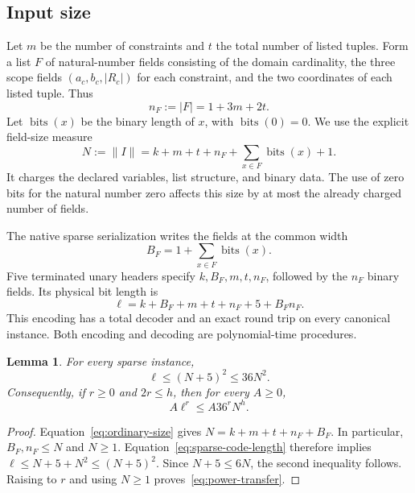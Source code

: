 \documentclass[11pt,reqno]{amsart}
\numberwithin{equation}{section}
\newtheorem{lemma}[theorem]{Lemma}
\theoremstyle{definition}
\theoremstyle{remark}
\newcommand{\bits}{\operatorname{bits}}
\begin{document}
\subsection{Input size}

Let $m$ be the number of constraints and $t$ the total number of listed tuples. Form a list $F$ of natural-number fields consisting of the domain cardinality, the three scope fields $(a_c,b_c,|R_c|)$ for each constraint, and the two coordinates of each listed tuple. Thus
\[
 n_F:=|F|=1+3m+2t.
\]
Let $\bits(x)$ be the binary length of $x$, with $\bits(0)=0$. We use the explicit field-size measure
\begin{equation}\label{eq:ordinary-size}
 N:=\lVert I\rVert
   =k+m+t+n_F+\sum_{x\in F}\bits(x)+1.
\end{equation}
It charges the declared variables, list structure, and binary data. The use of zero bits for the natural number zero affects this size by at most the already charged number of fields.

The native sparse serialization writes the fields at the common width
\[
 B_F=1+\sum_{x\in F}\bits(x).
\]
Five terminated unary headers specify $k,B_F,m,t,n_F$, followed by the $n_F$ binary fields. Its physical bit length is
\begin{equation}\label{eq:sparse-code-length}
 \ell=k+B_F+m+t+n_F+5+B_Fn_F.
\end{equation}
This encoding has a total decoder and an exact round trip on every canonical instance. Both encoding and decoding are polynomial-time procedures.

\begin{lemma}\label{lem:encoding}
For every sparse instance,
\begin{equation}\label{eq:encoding-bound}
 \ell\le(N+5)^2\le36N^2.
\end{equation}
Consequently, if $r\ge0$ and $2r\le h$, then for every $A\ge0$,
\begin{equation}\label{eq:power-transfer}
 A\ell^r\le A36^r N^h.
\end{equation}
\end{lemma}
\begin{proof}
Equation~\eqref{eq:ordinary-size} gives $N=k+m+t+n_F+B_F$. In particular, $B_F,n_F\le N$ and $N\ge1$. Equation~\eqref{eq:sparse-code-length} therefore implies $\ell\le N+5+N^2\le(N+5)^2$. Since $N+5\le6N$, the second inequality follows. Raising to $r$ and using $N\ge1$ proves~\eqref{eq:power-transfer}.
\end{proof}
\end{document}
